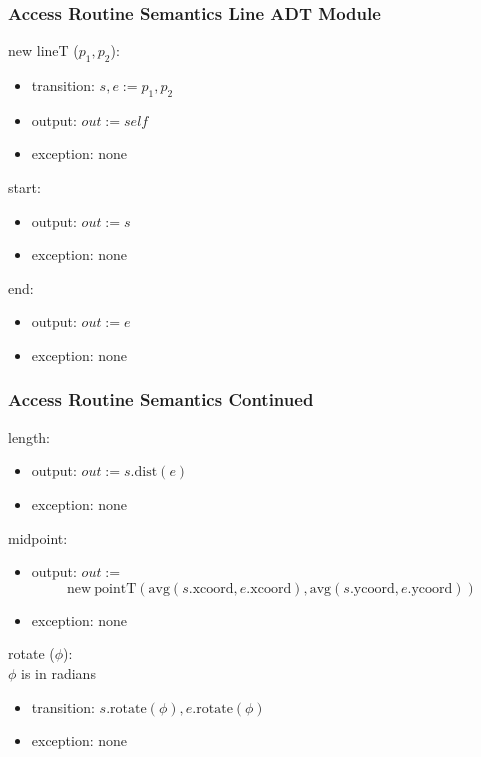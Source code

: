 \documentclass[t,12pt,numbers,fleqn,handout]{beamer}
\begin{document}

\begin{frame}
\frametitle{Access Routine Semantics Line ADT Module}

\noindent new lineT ($p_1, p_2$):
\begin{itemize}
\item transition: $s, e := p_1, p_2$
\item output: $out := \mathit{self}$
\item exception: none
\end{itemize}

\noindent start:
\begin{itemize}
\item output: $out := s$
\item exception: none
\end{itemize}

\noindent end:
\begin{itemize}
\item output: $out := e$
\item exception: none
\end{itemize}

\end{frame}


\begin{frame}
\frametitle{Access Routine Semantics Continued}

\noindent length:
\begin{itemize}
\item output: $out := s.\mathrm{dist}(e)$
\item exception: none
\end{itemize}

\noindent midpoint:
\begin{itemize}
\item output: $out := $
$$\mathrm{new~} \mathrm{pointT} (\mathrm{avg}(s.\mathrm{xcoord}, e.\mathrm{xcoord}), \mathrm{avg}(s.\mathrm{ycoord},
e.\mathrm{ycoord}))$$
\item exception: none
\end{itemize}

\noindent rotate ($\phi$):\\
$\phi$ is in radians
\begin{itemize}
\item transition: $s.\mathrm{rotate}(\phi), e.\mathrm{rotate}(\phi)$
\item exception: none
\end{itemize}

\end{frame}
\end{document}
